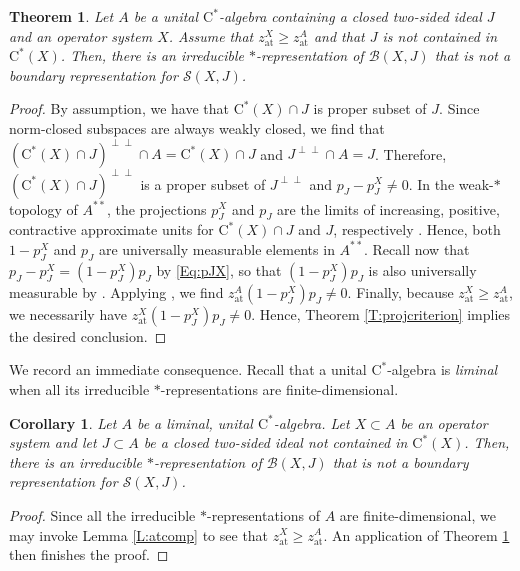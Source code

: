\documentclass[10pt]{amsart}
\newcommand{\B}{{\mathcal{B}}}
\renewcommand{\S}{{\mathcal{S}}}
\newcommand{\rC}{\mathrm{C}}
\newcommand{\at}{\operatorname{at}}
\newtheorem{theorem}[lemma]{Theorem}
\newtheorem{corollary}[lemma]{Corollary}
\theoremstyle{definition}
\begin{document}
\begin{theorem}\label{T:atcompat}
Let $A$ be a unital $\rC^*$-algebra containing a closed two-sided ideal $J$ and an operator system $X$. Assume that $z^X_{\at}\geq z^{A}_{\at}$ and that $J$ is not contained in $\rC^*(X)$. Then,  there is an irreducible  $*$-representation of $\B(X,J)$ that is not a boundary representation for $\S(X,J)$.
\end{theorem}
\begin{proof}
By assumption, we have that $\rC^*(X)\cap J$ is proper subset of $J$. Since norm-closed subspaces are always weakly closed, we find that $( \rC^*(X)\cap J)^{\perp\perp}\cap A=\rC^*(X)\cap J$ and $J^{\perp\perp}\cap A=J$. Therefore,  $(\rC^*(X)\cap J)^{\perp\perp}$ is a proper subset of $J^{\perp\perp}$ and $p_J-p_J^X\neq 0$.  In the weak-$*$ topology of $A^{**}$, the projections $p_J^X$ and $p_J$ are the limits of increasing, positive, contractive approximate units for $\rC^*(X)\cap J$ and $J$, respectively \cite[Proposition 2.5.8]{blecher2004operator}. Hence, both $1-p_J^X$ and $p_J$ are universally measurable elements in $A^{**}$. 
 Recall now that $p_J-p_J^X=(1-p_J^X)p_J$ by \eqref{Eq:pJX}, so that  $(1-p_J^X)p_J$ is also universally measurable by  \cite[Proposition 4.3.13]{pedersen2018}.  Applying \cite[Theorem 4.3.15]{pedersen2018}, we find  $z^A_{\at}(1-p_J^X)p_J\neq 0$.
Finally, because $z^X_{\at}\geq z^A_{\at}$, we necessarily have $z^X_{\at}(1-p_J^X)p_J\neq 0$. Hence, Theorem \ref{T:projcriterion} implies the desired conclusion.
\end{proof}

We record an immediate consequence. Recall that a unital $\rC^*$-algebra is \emph{liminal} when all its irreducible $*$-representations are finite-dimensional.

\begin{corollary}\label{C:liminal}
Let $A$ be a liminal, unital $\rC^*$-algebra. Let $X\subset A$ be an operator system and let $J\subset A$ be a closed two-sided ideal not contained in $\rC^*(X)$. Then,  there is an irreducible  $*$-representation of $\B(X,J)$ that is not a boundary representation for $\S(X,J)$.
\end{corollary}
\begin{proof}
Since all the irreducible $*$-representations of $A$ are finite-dimensional, we may invoke Lemma \ref{L:atcomp} to see that $z_{\at}^X\geq z^A_{\at}$. An application of Theorem \ref{T:atcompat} then finishes the proof.
\end{proof}
\end{document}
